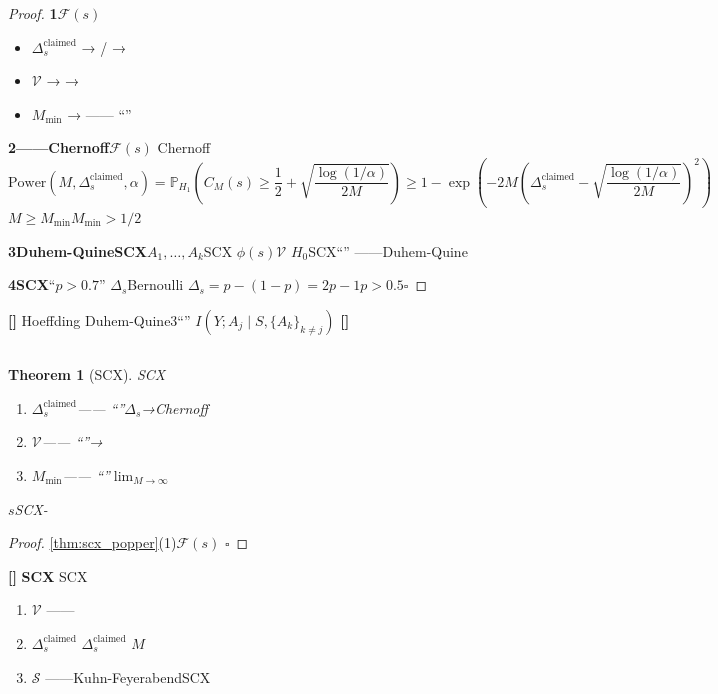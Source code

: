 \documentclass[11pt,a4paper]{article}
\newtheorem{theorem}{Theorem}[section]
\theoremstyle{remark}
\newcommand{\rigorous}{\textnormal{\textbf{[]}}}
\newcommand{\heuristic}{\textnormal{\textbf{[]}}}
\newcommand{\honeststrike}{\textnormal{\textbf{[]}}}
\begin{document}
\begin{proof}
\textbf{1}$\mathcal{F}(s)$
\begin{itemize}
    \item $\Delta_s^{\text{claimed}}$ → / → 
    \item $\mathcal{V}$ →  → 
    \item $M_{\text{min}}$ → ——
          ``''
\end{itemize}


\textbf{2——Chernoff}$\mathcal{F}(s)$
Chernoff
\begin{equation}
    \text{Power}(M, \Delta_s^{\text{claimed}}, \alpha)
    = \mathbb{P}_{H_1}\left(C_M(s) \geq \frac{1}{2} + \sqrt{\frac{\log(1/\alpha)}{2M}}\right)
    \geq 1 - \exp\left(-2M\left(\Delta_s^{\text{claimed}} - \sqrt{\frac{\log(1/\alpha)}{2M}}\right)^2\right)
\end{equation}
$M \geq M_{\text{min}}$$M_{\text{min}}$$> 1/2$

\textbf{3Duhem-QuineSCX}$A_1, \ldots, A_k$SCX
$\phi(s)$$\mathcal{V}$
$H_0$SCX``''
\textbf{}——Duhem-Quine

\textbf{4SCX}``$p > 0.7$''
$\Delta_s$Bernoulli
$\Delta_s = p - (1-p) = 2p-1$$p > 0.5$\hfill $\square$
\end{proof}

\rigorous{} \textbf{}Hoeffding
Duhem-Quine3``''
$I(Y; A_j \mid S, \{A_k\}_{k \neq j})$
\heuristic{}

\subsection{}

\begin{theorem}[SCX]
\label{thm:unfalsifiable_taxonomy}
SCX
\begin{enumerate}[label=(\textbf{UF\arabic*}), leftmargin=*]
    \item \textbf{}$\Delta_s^{\text{claimed}}$——
          ``''$\Delta_s$→Chernoff
    \item \textbf{}$\mathcal{V}$——
          ``''→
    \item \textbf{}$M_{\text{min}}$——
          ``''$\lim_{M \to \infty}$
    \end{enumerate}
$s$SCX-
\end{theorem}

\begin{proof}
\ref{thm:scx_popper}(1)$\mathcal{F}(s)$
\hfill $\square$
\end{proof}

\honeststrike{} \textbf{SCX}
SCX
\begin{enumerate}[label=(\arabic*)]
    \item \textbf{}$\mathcal{V}$
          ——
    \item \textbf{$\Delta_s^{\text{claimed}}$}
          $\Delta_s^{\text{claimed}}$\emph{}\emph{}
          $M$
    \item \textbf{}$\mathcal{S}$
          ——Kuhn-FeyerabendSCX
\end{enumerate}
\end{document}

